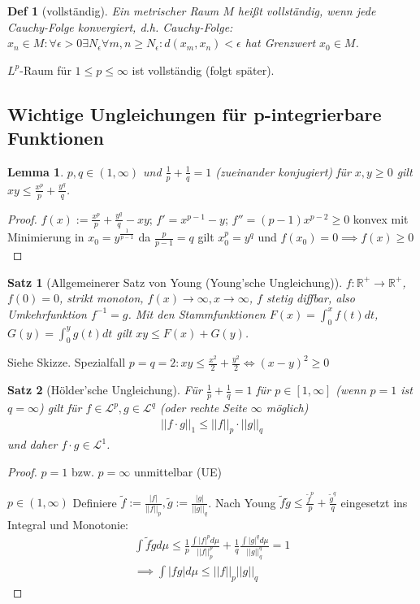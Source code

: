 \documentclass[]{article}
\newtheorem{theorem}{Satz}
\newtheorem{lemma}{Lemma}
\newtheorem*{definition*}{Def}
\begin{document}
\begin{definition*}[vollständig]
	Ein metrischer Raum $M$ heißt vollständig, wenn jede Cauchy-Folge konvergiert, d.h. Cauchy-Folge: $x_n \in M: \forall \epsilon > 0 \exists N_\epsilon \forall m,n \geq N_\epsilon: d(x_m, x_n) < \epsilon$ hat Grenzwert $x_0 \in M$.
\end{definition*}

$L^p$-Raum für $1\leq p \leq \infty$ ist vollständig (folgt später).

\subsection{Wichtige Ungleichungen für p-integrierbare Funktionen}
\begin{lemma}
	$p,q \in (1,\infty)$ und $\frac{1}{p}+\frac{1}{q} = 1$ (zueinander konjugiert) für $x,y\geq 0$ gilt $xy \leq \frac{x^p}{p} + \frac{y^q}{q}$.
\end{lemma}

\begin{proof}
	$f(x):= \frac{x^p}{p} + \frac{y^q}{q} - xy$; $f'=x^{p-1}-y$; $f''=(p-1)x^{p-2} \geq 0$ konvex mit Minimierung in $x_0=y^{\frac{1}{p-1}}$ da $\frac{p}{p-1}=q$ gilt $x_0^p = y^q$ und $f(x_0)=0 \implies f(x)\geq 0$
\end{proof}

\begin{theorem}[Allgemeinerer Satz von Young (Young'sche Ungleichung)]
	$f:\mathbb{R}^+ \rightarrow \mathbb{R}^+$, $f(0)=0$, strikt monoton, $f(x)\rightarrow\infty, x\rightarrow\infty$, $f$ stetig diffbar, also Umkehrfunktion $f^{-1}=g$. Mit den Stammfunktionen $F(x)=\int_{0}^{x}f(t)dt$, $G(y)=\int_{0}^{y}g(t)dt$ gilt $xy \leq F(x) + G(y)$.
\end{theorem}

Siehe Skizze. Spezialfall $p=q=2: xy \leq \frac{x^2}{2} + \frac{y^2}{2} \iff (x-y)^2 \geq 0$

\begin{theorem}[Hölder'sche Ungleichung]
	Für $\frac{1}{p} + \frac{1}{q} = 1$ für $p \in [1, \infty]$ (wenn $p=1$ ist $q=\infty$) gilt für $f\in \mathcal{L}^p, g \in \mathcal{L}^q$ (oder rechte Seite $\infty$ möglich)
	\begin{align*}
		|| f\cdot g||_1 \leq ||f||_p \cdot ||g||_q
	\end{align*}
	und daher $f\cdot g \in \mathcal{L}^1$.
\end{theorem}

\begin{proof}
	$p=1$ bzw. $p=\infty$ unmittelbar (UE)
	
	$p\in(1,\infty)$ Definiere $\tilde{f}:= \frac{|f|}{||f||_p}, \tilde{g}:= \frac{|g|}{||g||_q}$. Nach Young $\tilde{f}\tilde{g} \leq \frac{\tilde{f}^p}{p} + \frac{\tilde{g}^q}{q}$ eingesetzt ins Integral und Monotonie:
	\begin{align*}
		\int \tilde{f} \tilde{g} d\mu \leq \frac{1}{p} \frac{\int |f|^p d\mu}{||f||^p_p} + \frac{1}{q} \frac{\int |g|^q d\mu}{||g||^q_q} = 1\\
		\implies \int |fg| d\mu \leq ||f||_p ||g||_q
	\end{align*}
\end{proof}
\end{document}
